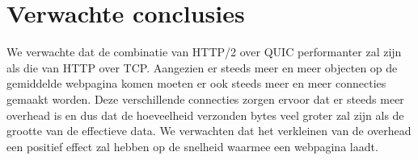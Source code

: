 \documentclass[fleqn,10pt]{voorstel}
\begin{document}
\section{Verwachte conclusies}
\label{sec:verwachte_conclusies}

We \cite{websiteStats} verwachte dat de combinatie van HTTP/2 over QUIC performanter zal zijn als die van HTTP over TCP. Aangezien er steeds meer en meer objecten op de gemiddelde webpagina komen moeten er ook steeds meer en meer connecties gemaakt worden. Deze verschillende connecties zorgen ervoor dat er steeds meer overhead is en dus dat de hoeveelheid verzonden bytes veel groter zal zijn als de grootte van de effectieve data. We verwachten dat het verkleinen van de overhead een positief effect zal hebben op de snelheid waarmee een webpagina laadt. 

\printbibliography[heading=bibintoc]
\end{document}
